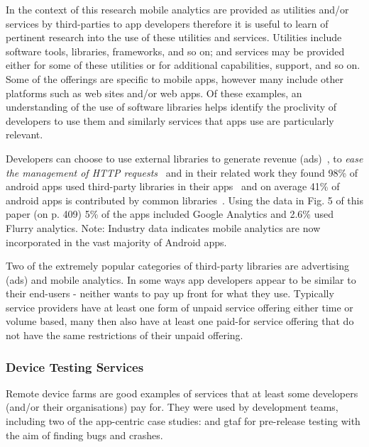 In the context of this research mobile analytics are provided as utilities and/or services by third-parties to app developers therefore it is useful to learn of pertinent research into the use of these utilities and services. Utilities include software tools, libraries, frameworks, and so on; and services may be provided either for some of these utilities or for additional capabilities, support, and so on. Some of the offerings are specific to mobile apps, however many include other platforms such as web sites and/or web apps. Of these examples, an understanding of the use of software libraries helps identify the proclivity of developers to use them and similarly services that apps use are particularly relevant.


Developers can choose to use external libraries to generate revenue (ads)~, to \emph{ease the management of HTTP requests}~ and in their related work they found 98\% of android apps used third-party libraries in their apps~ and on average 41\% of android apps is contributed by common libraries~. Using the data in Fig. 5 of this paper (on p. 409) 5\% of the apps included Google Analytics and 2.6\% used Flurry analytics. Note: Industry data indicates mobile analytics are now incorporated in the vast majority of Android apps.  

Two of the extremely popular categories of third-party libraries are advertising (ads) and mobile analytics.
In some ways app developers appear to be similar to their end-users - neither wants to pay up front for what they use. Typically service providers have at least one form of unpaid service offering either time or volume based, many then also have at least one paid-for service offering that do not have the same restrictions of their unpaid offering.


\subsubsection{Device Testing Services}
Remote device farms are good examples of services that at least some developers (and/or their organisations) pay for. They were used by development teams, including two of the app-centric case studies:  and \Gls{gtaf} for pre-release testing with the aim of finding bugs and crashes.

